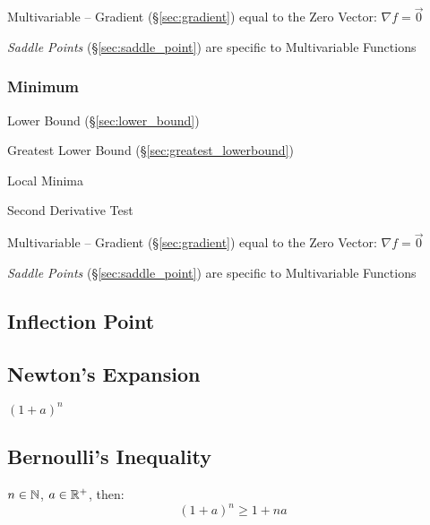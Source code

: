 Multivariable -- Gradient (\S\ref{sec:gradient}) equal to the Zero Vector:
$\nabla{f} = \vec{0}$

\fist \emph{Saddle Points} (\S\ref{sec:saddle_point}) are specific to
Multivariable Functions



\subsubsection{Minimum}\label{sec:minimum}

Lower Bound (\S\ref{sec:lower_bound})

Greatest Lower Bound (\S\ref{sec:greatest_lowerbound})

Local Minima

Second Derivative Test

Multivariable -- Gradient (\S\ref{sec:gradient}) equal to the Zero Vector:
$\nabla{f} = \vec{0}$

\fist \emph{Saddle Points} (\S\ref{sec:saddle_point}) are specific to
Multivariable Functions



\subsection{Inflection Point}\label{sec:inflection_point}

\subsection{Newton's Expansion}\label{sec:newtons_expansion}


$(1 + a)^n$ %



\subsection{Bernoulli's Inequality}\label{sec:bernoullis_inequality}

$n \in \mathbb{N}$, $a \in \mathbb{R}^+$, then:
\[
  (1 + a)^n \geq 1 + n a
\]


